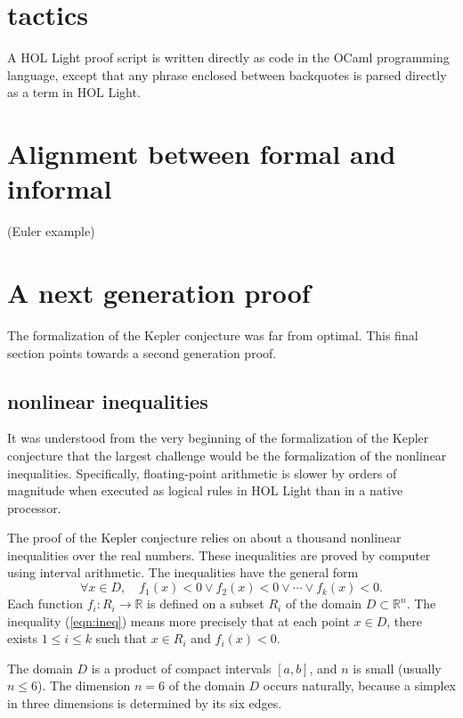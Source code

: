 \documentclass{amsart}
\newcommand{\ring}[1]{\mathbb{#1}}
\begin{document}
\section{tactics}

A HOL Light proof script is written directly as code in the
OCaml programming language, except that any phrase enclosed between
backquotes is parsed directly as a term in HOL Light.  


\section{Alignment between formal and informal}

(Euler example)

\section{A next generation proof}

The formalization of the Kepler conjecture was far from optimal.  This
final section points towards a second generation proof.

\subsection{nonlinear inequalities}
It was understood from the very beginning of the formalization of the
Kepler conjecture that the largest challenge would be the
formalization of the nonlinear inequalities.  Specifically,
floating-point arithmetic is slower by orders of magnitude when
executed as logical rules in HOL Light than in a native processor.

The proof of the Kepler conjecture relies on about a thousand
nonlinear inequalities over the real numbers.  These inequalities
are proved by computer using interval arithmetic. The inequalities
have the general form 
\begin{equation}\label{eqn:ineq}
\forall x \in D,\quad f_1(x) < 0 \lor f_2(x) < 0 \lor \cdots \lor f_k(x) < 0.
\end{equation}
Each function $f_i : R_i \to \ring{R}$ is defined on a subset $R_i$ of the
domain $D\subset \ring{R}^n$.
The inequality (\ref{eqn:ineq}) means more precisely that 
at each point $x\in D$, there exists $1\le i\le k$ such that
$x \in R_i$ and $f_i(x) < 0$. 

The domain $D$ is a product of 
compact intervals $[a,b]$, and $n$ is small (usually $n\le 6$).  
The dimension $n=6$ of the domain $D$ occurs naturally, because a
simplex in three dimensions is determined by its six edges.
\end{document}
